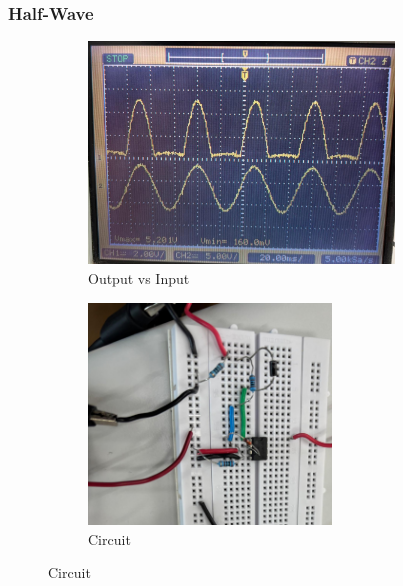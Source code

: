 \documentclass[a4paper,12pt]{article}
\begin{document}
\subsubsection*{Half-Wave}
\begin{figure}[!h]
	\begin{subfigure}[b]{100pt}
		\caption{Output vs Input}
		\includegraphics[width = 230pt]{figs/half1.png}
	\end{subfigure}
	\hspace{110pt}
	\begin{subfigure}[b]{100pt}
		\caption{Circuit}
		\includegraphics[width = 183pt]{figs/half2.png}
	\end{subfigure}
\end{figure}
\pagebreak
\end{document}
